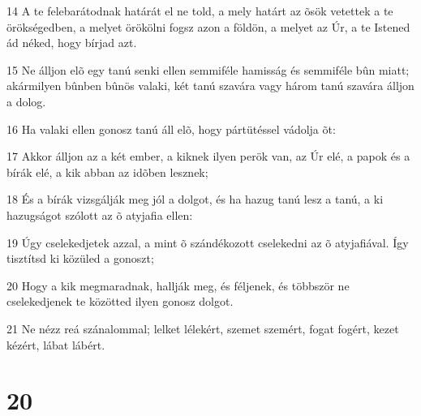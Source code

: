 \par 14 A te felebarátodnak határát el ne told, a mely határt az õsök vetettek a te örökségedben, a melyet örökölni fogsz azon a földön, a melyet az Úr, a te Istened ád néked, hogy bírjad azt.
\par 15 Ne álljon elõ egy tanú senki ellen semmiféle hamisság és semmiféle bûn miatt; akármilyen bûnben bûnös valaki, két tanú szavára vagy három tanú szavára álljon a dolog.
\par 16 Ha valaki ellen gonosz tanú áll elõ, hogy pártütéssel vádolja õt:
\par 17 Akkor álljon az a két ember, a kiknek ilyen perök van, az Úr elé, a papok és a bírák elé, a kik abban az idõben lesznek;
\par 18 És a bírák vizsgálják meg jól a dolgot, és ha hazug tanú lesz a tanú, a ki hazugságot szólott az õ atyjafia ellen:
\par 19 Úgy cselekedjetek azzal, a mint õ szándékozott cselekedni az õ atyjafiával. Így tisztítsd ki közüled a gonoszt;
\par 20 Hogy a kik megmaradnak, hallják meg, és féljenek, és többször ne cselekedjenek te közötted ilyen gonosz dolgot.
\par 21 Ne nézz reá szánalommal; lelket lélekért, szemet szemért, fogat fogért, kezet kézért, lábat lábért.

\chapter{20}

